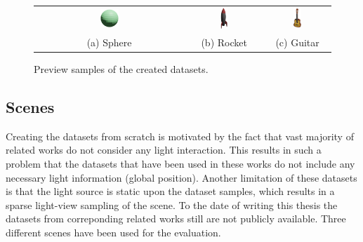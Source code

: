\begingroup
\setlength{\tabcolsep}{40pt} %
\begin{figure}[!htb]
    \centering
    \begin{tabular}{ccc}
          \includegraphics[width=0.13\textwidth]{figures/sphere.png}
          & \includegraphics[width=0.1\textwidth]{figures/rocket.png}
          & \includegraphics[width=0.13\textwidth]{figures/guitar.png}
          \\(a) Sphere & (b) Rocket & (c) Guitar
    \end{tabular}
    \caption{
    Preview samples of the created datasets.
}
\label{fig:dataset_preview}
\end{figure}
\endgroup

\subsection{Scenes}

Creating the datasets from scratch is motivated by the fact that
vast majority of related works do not consider any light interaction.
This results in such a problem that the datasets that have been used in these works
do not include any necessary light information (global position).
Another limitation of these datasets is that the light source is static upon the dataset samples,
which results in a sparse light-view sampling of the scene.
To the date of writing this thesis the datasets from correponding related works \cite{nerv2021}
still are not publicly available.
Three different scenes have been used for the evaluation.


